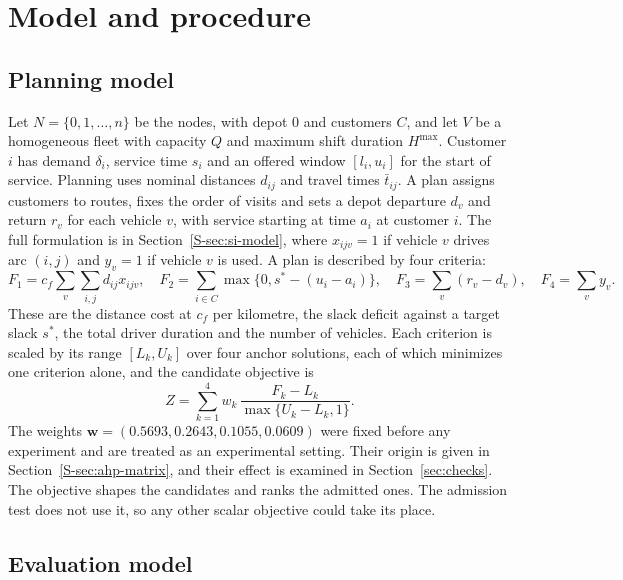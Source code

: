 \documentclass{itor}
\newcommand{\SI}[1]{Section~\ref{S-#1}}
\begin{document}
\section{Model and procedure}\label{sec:method}

\subsection{Planning model}

Let $N=\{0,1,\ldots,n\}$ be the nodes, with depot 0 and customers $C$, and let
$V$ be a homogeneous fleet with capacity $Q$ and maximum shift duration
$H^{\max}$. Customer $i$ has demand $\delta_i$, service time $s_i$ and an
offered window $[l_i,u_i]$ for the start of service. Planning uses nominal
distances $d_{ij}$ and travel times $\bar t_{ij}$. A plan assigns customers to
routes, fixes the order of visits and sets a depot departure $d_v$ and return
$r_v$ for each vehicle $v$, with service starting at time $a_i$ at customer $i$.
The full formulation is in \SI{sec:si-model}, where $x_{ijv}=1$ if vehicle $v$
drives arc $(i,j)$ and $y_v=1$ if vehicle $v$ is used. A plan is described by
four criteria:
\begin{equation}
 F_1=c_f\sum_{v}\sum_{i,j}d_{ij}x_{ijv},\quad
 F_2=\sum_{i\in C}\max\{0,s^*-(u_i-a_i)\},\quad
 F_3=\sum_{v}(r_v-d_v),\quad
 F_4=\sum_{v}y_v.                                       \label{eq:criteria}
\end{equation}
These are the distance cost at $c_f$ per kilometre, the slack deficit against a
target slack $s^*$, the total driver duration and the number of vehicles. Each
criterion is scaled by its range $[L_k,U_k]$ over four anchor solutions, each of
which minimizes one criterion alone, and the candidate objective is
\begin{equation}
 Z=\sum_{k=1}^{4}w_k\,\frac{F_k-L_k}{\max\{U_k-L_k,1\}}.        \label{eq:objective}
\end{equation}
The weights $\mathbf{w}=(0.5693,0.2643,0.1055,0.0609)$ were fixed before any
experiment and are treated as an experimental setting. Their origin is given in
\SI{sec:ahp-matrix}, and their effect is examined in Section~\ref{sec:checks}.
The objective shapes the candidates and ranks the admitted ones. The admission
test does not use it, so any other scalar objective could take its place.

\subsection{Evaluation model}
\end{document}

